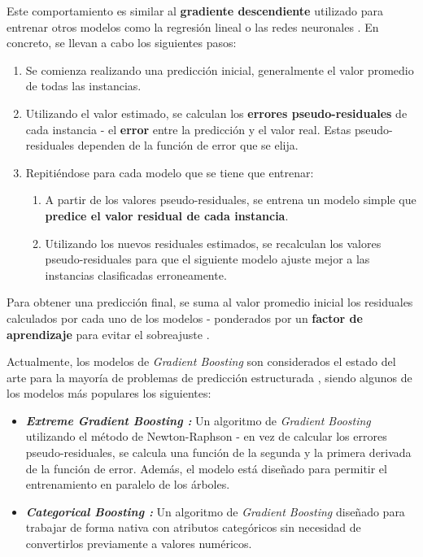 \begin{itemize}[leftmargin=*]
	Este comportamiento es similar al \textbf{gradiente descendiente} utilizado para entrenar otros modelos como la regresión lineal o las redes neuronales \cite{Burkov2019TheHM}. En concreto, se llevan a cabo los siguientes pasos:
	\begin{enumerate}
		\item Se comienza realizando una predicción inicial, generalmente el valor promedio de todas las instancias.
		\item Utilizando el valor estimado, se calculan los \textbf{errores pseudo-residuales} de cada instancia - el \textbf{error} entre la predicción y el valor real. Estas pseudo-residuales dependen de la función de error que se elija.
		\item Repitiéndose para cada modelo que se tiene que entrenar:
		\begin{enumerate}
			\item A partir de los valores pseudo-residuales, se entrena un modelo simple que \textbf{predice el valor residual de cada instancia}.
			\item Utilizando los nuevos residuales estimados, se recalculan los valores pseudo-residuales para que el siguiente modelo ajuste mejor a las instancias clasificadas erroneamente.
		\end{enumerate}
	\end{enumerate}
	
	Para obtener una predicción final, se suma al valor promedio inicial los residuales calculados por cada uno de los modelos - ponderados por un \textbf{factor de aprendizaje} para evitar el sobreajuste \cite{gradientboosting}.
	
	Actualmente, los modelos de \textit{Gradient Boosting} son considerados el estado del arte para la mayoría de problemas de predicción estructurada \cite{Burkov2019TheHM}, siendo algunos de los modelos más populares los siguientes:
	
	\begin{itemize}
		\item \textbf{\textit{Extreme Gradient Boosting \cite{Chen_2016}:}} Un algoritmo de \textit{Gradient Boosting} utilizando el método de Newton-Raphson - en vez de calcular los errores pseudo-residuales, se calcula una función de la segunda y la primera derivada de la función de error. Además, el modelo está diseñado para permitir el entrenamiento en paralelo de los árboles.
		\item \textbf{\textit{Categorical Boosting \cite{dorogush2018catboostgradientboostingcategorical}:}} Un algoritmo de \textit{Gradient Boosting} diseñado para trabajar de forma nativa con atributos categóricos sin necesidad de convertirlos previamente a valores numéricos. 
		

\end{itemize}
\end{itemize}
